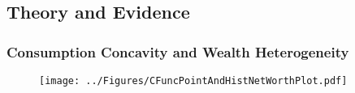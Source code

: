 



\subsection{Theory and Evidence}
\begin{frame}[label=cFuncAndW]
\frametitle{Consumption Concavity and Wealth Heterogeneity}
\begin{figure}
\centering
\texttt{[image: ../Figures/CFuncPointAndHistNetWorthPlot.pdf]}
\end{figure}
\end{frame}




\begin{comment}
\subsection{Essential Consumption Microfoundations}
\begin{frame}
\frametitle{Microeconomics of Consumption}

\begin{block}{Since Friedman's (1957) PIH:}
  \begin{itemize}
    \item $c$ chosen optimally:\\
     \jemph{~~Want to smooth $c$ {\it in light of} $y$ fluctuations}
    \item Single most important thing to get right is \jemph{{income dynamics}}!
    \item With smooth $c$, income dynamics \jemph{drive everything!}
    \begin{itemize}
        \item \jemph{Saving/dissaving:} Depends on whether $\Ex[\Delta y]\uparrow$ or $\Ex[\Delta y]\downarrow$
        \item \jemph{Wealth distribution} depends on integration of saving
    \end{itemize}
    \item \jemph{Cardinal sin:} Assume crazy income dynamics
    \begin{itemize}
      \item No end can justify this means
      \item Throws out the defining core of the intellectual framework
    \end{itemize}
  \end{itemize}
\end{block}


\end{comment}

